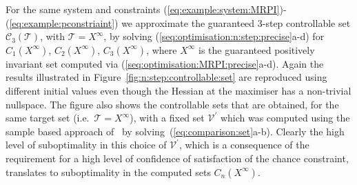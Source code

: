 \documentclass{ifacconf}
\providecommand{\norm}[1]{\left\|#1\right\|}
\providecommand{\C}{\mathscr C}
\providecommand{\V}{\mathcal V}
\providecommand{\T}{\mathcal T}
\begin{document}
%
For the same system and constraints (\ref{eq:example:system:MRPI})-(\ref{eq:example:pconstriaint}) we approximate the guaranteed 3-step controllable set $\C_3(\T)$, with $\T=X^\infty$,
%
by solving (\ref{seq:optimisation:n:step:precise}a-d) for $C_1(X^\infty)$, $C_2(X^\infty)$, $C_3(X^\infty)$, where $X^\infty$ is the guaranteed positively invariant set computed via (\ref{seq:optimisation:MRPI:precise}a-d).
%
Again the results illustrated in Figure~\ref{fig:n:step:controllable:set} are reproduced using different initial values even though the Hessian at the maximiser has a non-trivial nullspace. The figure also shows the controllable sets that are obtained, for the same target set (i.e.~$\T=X^\infty$), with a fixed set $\V^\prime$ which was computed using the sample based approach of~\citet{Zhang2015} by solving~(\ref{eq:comparison:set}a-b). Clearly the high level of suboptimality in this choice of $\V^\prime$, 
which is a consequence of 
the requirement for a high level of confidence of satisfaction of the chance constraint, translates to suboptimality in the computed sets $C_n(X^\infty)$.
%
\end{document}
